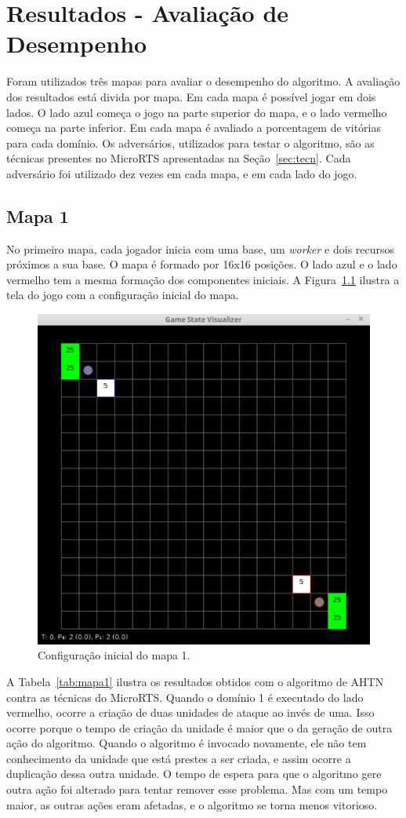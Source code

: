 
\chapter{\label{chap:ativ}Resultados - Avaliação de Desempenho}

Foram utilizados três mapas para avaliar o desempenho do algoritmo.
A avaliação dos resultados está divida por mapa.
Em cada mapa é possível jogar em dois lados.
O lado azul começa o jogo na parte superior do mapa, e o lado vermelho começa na parte inferior.
Em cada mapa é avaliado a porcentagem de vitórias para cada domínio.
Os adversários, utilizados para testar o algoritmo, são as técnicas presentes no MicroRTS apresentadas na Seção~\ref{sec:tecn}.
Cada adversário foi utilizado dez vezes em cada mapa, e em cada lado do jogo.

\section{Mapa 1}

No primeiro mapa, cada jogador inicia com uma base, um \textit{worker} e dois recursos próximos a sua base.
O mapa é formado por 16x16 posições.
O lado azul e o lado vermelho tem a mesma formação dos componentes iniciais.
A Figura~\ref{fig:mapa16x16} ilustra a tela do jogo com a configuração inicial do mapa.

\begin{figure}[ht]
	\centering
	\includegraphics[width=.5\textwidth]{fig/map16x16.pdf}
	\caption{Configuração inicial do mapa 1.}
	\label{fig:mapa16x16}
\end{figure}


A Tabela~\ref{tab:mapa1} ilustra os resultados obtidos com o algoritmo de AHTN contra as técnicas do MicroRTS.
Quando o domínio 1 é executado do lado vermelho, ocorre a criação de duas unidades de ataque ao invés de uma.
Isso ocorre porque o tempo de criação da unidade é maior que o da geração de outra ação do algoritmo.
Quando o algoritmo é invocado novamente, ele não tem conhecimento da unidade que está prestes a ser criada, e assim ocorre a duplicação dessa outra unidade.
O tempo de espera para que o algoritmo gere outra ação foi alterado para tentar remover esse problema.
Mas com um tempo maior, as outras ações eram afetadas, e o algoritmo se torna menos vitorioso.

